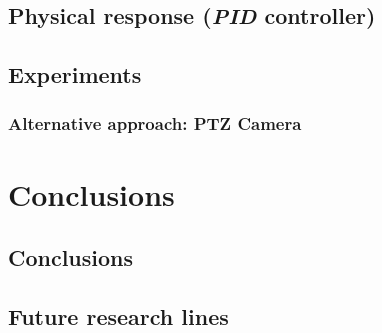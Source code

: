 \section{Physical response (\emph{PID} controller)}
\section{Experiments}
\subsection{Alternative approach: PTZ Camera}
\label{sec:follow_ptz}


\chapter{Conclusions}
	\section{Conclusions}
	\section{Future research lines}